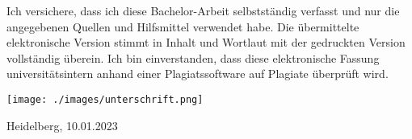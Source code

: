 \onehalfspacing

\thispagestyle{empty}

\vspace*{100pt}
\noindent
Ich versichere, dass ich diese Bachelor-Arbeit selbstständig verfasst und nur die angegebenen Quellen und Hilfsmittel verwendet habe. Die übermittelte elektronische Version stimmt in Inhalt und Wortlaut mit der gedruckten Version vollständig überein. Ich bin einverstanden, dass diese elektronische Fassung universitätsintern anhand einer Plagiatssoftware auf Plagiate überprüft wird. 

\vspace*{15pt}

\texttt{[image: ./images/unterschrift.png]}

\noindent
Heidelberg, 10.01.2023
\cleardoublepage

